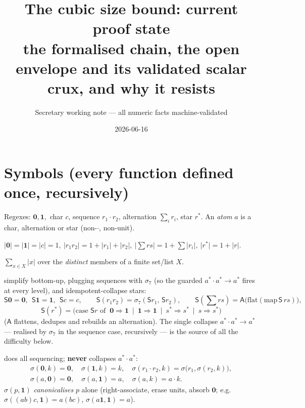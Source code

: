 \documentclass[11pt]{article}
\title{\textbf{The cubic size bound: current proof state}\\[2pt]
\large the formalised chain, the open envelope and its validated scalar crux, and why it resists}
\author{Secretary working note --- all numeric facts machine-validated}
\date{2026-06-16}
\newcommand{\rs}[1]{\lvert #1\rvert}                 %
\newcommand{\rss}[1]{\lVert #1\rVert}                %
\newcommand{\Strong}{\mathsf{S}}                     %
\newcommand{\sig}{\sigma}                            %
\newcommand{\sigt}{\sig_{\!7}}                       %
\newcommand{\seq}{\cdot}
\newcommand{\one}{\mathbf 1}
\newcommand{\zero}{\mathbf 0}
\theoremstyle{definition}
\begin{document}
\maketitle

\section{Symbols (every function defined once, recursively)}\label{sec:notation}

Regexes: $\zero,\one,$ char $c$, sequence $r_1\seq r_2$, alternation $\sum_i r_i$, star $r^{*}$. An \emph{atom} $a$ is a
char, alternation or star (non-$\seq$, non-unit).

\begin{description}[leftmargin=2.2em,style=nextline,itemsep=3pt]

\item[$\rs r$ \rm(size)] $\rs\zero=\rs\one=\rs c=1,\ \rs{r_1r_2}=1+\rs{r_1}+\rs{r_2},\ \rs{\sum rs}=1+\sum\rs{r_i},\ \rs{r^{*}}=1+\rs r$.

\item[$\rss X$ \rm(set size)] $\sum_{x\in X}\rs x$ over the \emph{distinct} members of a finite set/list $X$.

\item[$\Strong$ \rm(strong normaliser; ``rsimpStrong\_raw'')] simplify bottom-up, plugging sequences with $\sigt$ (so the
guarded $a^{*}\seq a^{*}\to a^{*}$ fires at every level), and idempotent-collapse stars:
\[
\Strong\zero=\zero,\ \ \Strong\one=\one,\ \ \Strong c=c,\qquad
\Strong(r_1r_2)=\sigt(\Strong r_1,\,\Strong r_2),\qquad
\Strong(\textstyle\sum rs)=\mathsf A\bigl(\mathrm{flat}(\mathrm{map}\,\Strong\,rs)\bigr),
\]
\[
\Strong(r^{*})=\bigl(\text{case }\Strong r\text{ of }\ \zero\Rightarrow\one\ \mid\ \one\Rightarrow\one\ \mid\ s^{*}\Rightarrow s^{*}\ \mid\ s\Rightarrow s^{*}\bigr)
\]
($\mathsf A$ flattens, dedupes and rebuilds an alternation). The single collapse $a^{*}\seq a^{*}\to a^{*}$ --- realised by
$\sigt$ in the sequence case, recursively --- is the source of all the difficulty below.

\item[$\sig(h,k)$ \rm(weak plug: ``$h$ then $k$'')] does all sequencing; \textbf{never} collapses $a^{*}\seq a^{*}$:
\begin{gather*}
\sig(\zero,k)=\zero,\quad \sig(\one,k)=k,\quad \sig(r_1\seq r_2,k)=\sig\!\bigl(r_1,\sig(r_2,k)\bigr),\\
\sig(a,\zero)=\zero,\quad \sig(a,\one)=a,\quad \sig(a,k)=a\seq k.
\end{gather*}
$\sig(p,\one)$ \emph{canonicalises} $p$ alone (right-associate, erase units, absorb $\zero$; e.g.\ $\sig((ab)c,\one)=a(bc)$,
$\sig(a\one,\one)=a$).


\end{description}
\end{document}
